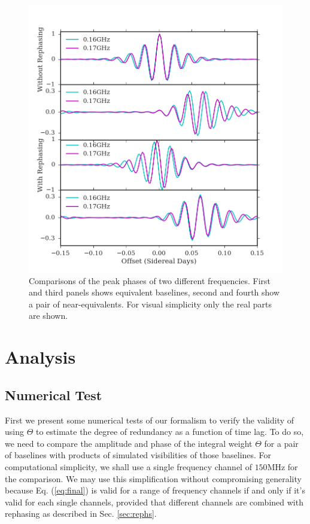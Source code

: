 \documentclass[twocolumn,apj,numberedappendix]{emulateapj}
\renewcommand\[{\begin{equation}}
\renewcommand\]{\end{equation}}
\begin{document}
\begin{figure}[H]
\includegraphics[width=1.1\linewidth]{rephs}

\caption{Comparisons of the peak phases of two different frequencies. First and third panels shows equivalent baselines, second and fourth show a pair of near-equivalents. For visual simplicity only the real parts are shown. }
\label{fig:freqdiff}
\end{figure}


\section{Analysis}
\subsection{Numerical Test \label{sec:Techniquet}}

First we present some numerical tests of our formalism to verify the validity of using $\Theta$ to estimate the degree of redundancy as a function of time lag. To do so, we need to compare the amplitude and phase of the integral weight $\Theta$ 
for a pair of baselines with products of simulated visibilities of those baselines. For computational simplicity, we shall use a single frequency channel of $150$MHz for the comparison. We may use this simplification without compromising generality because Eq. (\ref{eq:final}) is valid for a range of frequency channels if and only if it's valid for each single channels, provided that different channels are combined with rephasing as described in Sec. \ref{sec:rephs}. 
\end{document}
